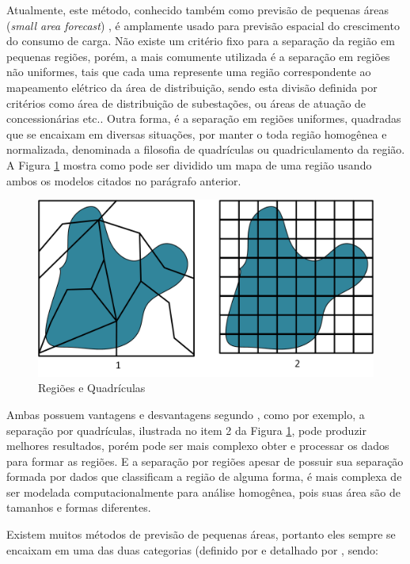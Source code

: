 Atualmente, este método, conhecido também como previsão de pequenas áreas (\emph{small area forecast}) \cite{willis1995spatial}, é amplamente usado para previsão espacial do crescimento do consumo de carga. Não existe um critério fixo para a separação da região em pequenas regiões, porém, a mais comumente utilizada é a separação em regiões não uniformes, tais que cada uma represente uma região correspondente ao mapeamento elétrico da área de distribuição, sendo esta divisão definida por critérios como área de distribuição de subestações, ou áreas de atuação de concessionárias etc.. Outra forma, é a separação em regiões uniformes, quadradas que se encaixam em diversas situações, por manter o toda região homogênea e normalizada, denominada a filosofia de quadrículas ou quadriculamento da região. A Figura \ref{fig:RegionsAndQuadrics} mostra como pode ser dividido um mapa de uma região usando ambos os modelos citados no parágrafo anterior. 

\begin{figure}[h]
	\centering	
	\includegraphics[scale=0.55]{Figuras/RegionsAndQuadrics.png}
	\caption{Regiões e Quadrículas}
	\label{fig:RegionsAndQuadrics}
\end{figure}

Ambas possuem vantagens e desvantagens segundo \citeauthor{willis2002spatial} \cite{willis2002spatial}, como por exemplo, a separação por quadrículas, ilustrada no item 2 da Figura \ref{fig:RegionsAndQuadrics}, pode produzir melhores resultados, porém pode ser mais complexo obter e processar os dados para formar as regiões. E a separação por regiões apesar de possuir sua separação formada por dados que classificam a região de alguma forma, é mais complexa de ser modelada computacionalmente para análise homogênea, pois suas área são de tamanhos e formas diferentes.

Existem muitos métodos de previsão de pequenas áreas, portanto eles sempre se encaixam em uma das duas categorias (definido por \citeauthor{willis2002spatial} \cite{willis2002spatial} e detalhado por \citeauthor{arango2000thesis} \cite{arango2000thesis}, sendo:

